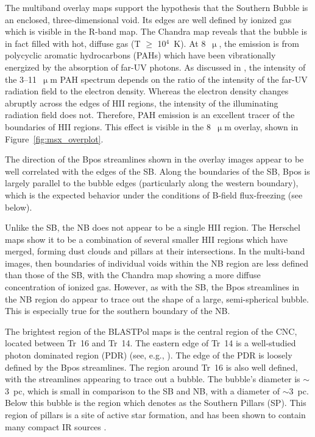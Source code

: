 The multiband overlay maps support the hypothesis that the Southern Bubble is an enclosed, three-dimensional void. Its edges are well defined by ionized gas which is visible in the R-band map. The Chandra map reveals that the bubble is in fact filled with hot, diffuse gas (T $\geq$ 10$^{4}$~K). At 8~$\upmu$, the emission is from polycyclic aromatic hydrocarbons (PAHs) which have been vibrationally energized by the absorption of far-UV photons. As discussed in \citet{li2006results}, the intensity of the 3--11~$\upmu$m PAH spectrum depends on the ratio of the intensity of the far-UV radiation field to the electron density. Whereas the electron density changes abruptly across the edges of HII regions, the intensity of the illuminating radiation field does not. Therefore, PAH emission is an excellent tracer of the boundaries of HII regions. This effect is visible in the 8~$\upmu$m overlay, shown in Figure~\ref{fig:msx_overplot}.

The direction of the \gls{Bpos} streamlines shown in the overlay images appear to be well correlated with the edges of the SB. Along the boundaries of the SB, \gls{Bpos} is largely parallel to the bubble edges (particularly along the western boundary), which is the expected behavior under the conditions of B-field flux-freezing \citep{li2006results} (see below).

Unlike the SB, the NB does not appear to be a single HII region. The Herschel maps show it to be a combination of several smaller HII regions which have merged, forming dust clouds and pillars at their intersections. In the multi-band images, then boundaries of individual voids within the NB region are less defined than those of the SB, with the Chandra map showing a more diffuse concentration of ionized gas. However, as with the SB, the \gls{Bpos} streamlines in the NB region do appear to trace out the shape of a large, semi-spherical bubble. This is especially true for the southern boundary of the NB.

The brightest region of the BLASTPol maps is the central region of the CNC, located between Tr~16 and Tr~14. The eastern edge of Tr~14 is a well-studied photon dominated region (PDR) (see, e.g., \citet{kramer2008clumpy}). The edge of the PDR is loosely defined by the \gls{Bpos} streamlines. The region around Tr~16 is also well defined, with the streamlines appearing to trace out a bubble. The bubble's diameter is $\sim$3~pc, which is small in comparison to the SB and NB, with a diameter of $\sim$3~pc. Below this bubble is the region which \citet{preibisch2012herschel} denotes as the Southern Pillars (SP). This region of pillars is a site of active star formation, and has been shown to contain many compact IR sources \citep{smith2010spitzer}.

